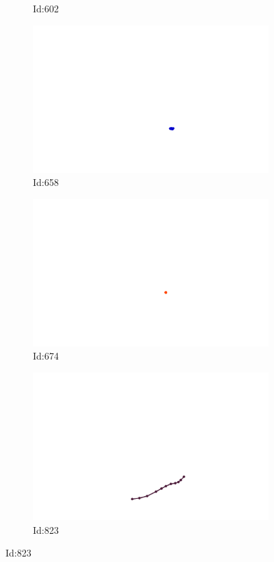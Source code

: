 \documentclass[12pt,twoside]{report}
\begin{document}
\begin{figure}
\begin{subfigure}[b]{0.20\textwidth}
\caption{Id:602}
\end{subfigure}
\begin{subfigure}[b]{0.20\textwidth}
\centering
\includegraphics[width=\textwidth]{../../trajectories/658.png}
\caption{Id:658}
\end{subfigure}
\begin{subfigure}[b]{0.20\textwidth}
\centering
\includegraphics[width=\textwidth]{../../trajectories/674.png}
\caption{Id:674}
\end{subfigure}
\begin{subfigure}[b]{0.20\textwidth}
\centering
\includegraphics[width=\textwidth]{../../trajectories/823.png}
\caption{Id:823}
\end{subfigure}
\end{figure}
\end{document}
